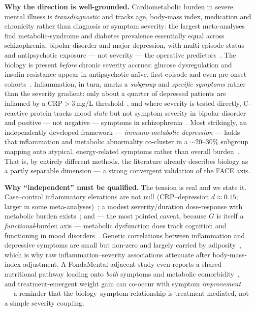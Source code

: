 \textbf{Why the direction is well-grounded.} Cardiometabolic burden in severe mental illness is
\emph{transdiagnostic} and tracks age, body-mass index, medication and chronicity rather than diagnosis or
symptom severity: the largest meta-analyses find metabolic-syndrome and diabetes prevalence essentially equal
across schizophrenia, bipolar disorder and major depression, with multi-episode status and antipsychotic
exposure --- not severity --- the operative predictors~\cite{vancampfort2015metabolic,vancampfort2016diabetes}.
The biology is present \emph{before} chronic severity accrues: glucose dysregulation and insulin resistance
appear in antipsychotic-naïve, first-episode and even pre-onset cohorts~\cite{pillinger2017glucose,perry2019dysglycaemia,garridotorres2022metabolic}.
Inflammation, in turn, marks a \emph{subgroup} and \emph{specific symptoms} rather than the severity gradient:
only about a quarter of depressed patients are inflamed by a CRP$>$3\,mg/L threshold~\cite{osimo2019prevalence},
and where severity is tested directly, C-reactive protein tracks mood \emph{state} but not symptom severity in
bipolar disorder~\cite{fernandes2016bipolar} and positive --- not negative --- symptoms in
schizophrenia~\cite{fernandes2016schizophrenia}. Most strikingly, an independently developed framework ---
\emph{immuno-metabolic depression} --- holds that inflammation and metabolic abnormality co-cluster in a
$\sim$20--30\% subgroup mapping onto atypical, energy-related symptoms rather than overall
burden~\cite{penninx2024imd,milaneschi2020imd,lamers2013subtypes,lamers2020profilers}. That is, by entirely
different methods, the literature already describes biology as a partly separable dimension --- a strong
convergent validation of the FACE axis.

\textbf{Why ``independent'' must be qualified.} The tension is real and we state it. Case--control inflammatory
elevations are not null (CRP--depression $d\approx0.15$; larger in some
meta-analyses)~\cite{howren2009crp,osimo2020inflammation}; a modest severity/duration dose-response with
metabolic burden exists~\cite{penninx2018metabolic,pillinger2022variability}; and --- the most pointed caveat,
because $G$ is itself a \emph{functional}-burden axis --- metabolic dysfunction does track cognition and
functioning in mood disorders~\cite{maksyutynska2024cognition}. Genetic correlations between inflammation and
depressive symptoms are small but non-zero and largely carried by adiposity~\cite{kappelmann2021mr,khandaker2014il6},
which is why raw inflammation--severity associations attenuate after body-mass-index adjustment. A
FondaMental-adjacent study even reports a shared nutritional pathway loading onto \emph{both} symptoms and
metabolic comorbidity~\cite{faugere2025vitamins}, and treatment-emergent weight gain can co-occur with symptom
\emph{improvement}~\cite{luckhoff2018weight} --- a reminder that the biology--symptom relationship is
treatment-mediated, not a simple severity coupling.

